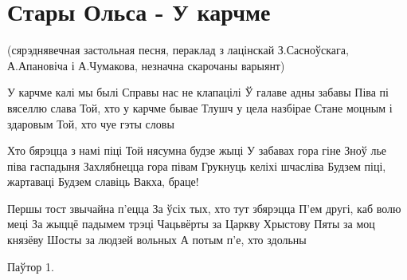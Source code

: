 \section{Стары Ольса - У карчме}
\begin{guitar}

(сярэднявечная застольная песня, пераклад з лацінскай 
З.Сасноўскага, А.Апановіча і А.Чумакова, незначна скарочаны варыянт)

У карчме калі мы былі
Справы нас не клапацілі
Ў галаве адны забавы
Піва пі вяселлю слава
Той, хто у карчме бывае
Тлушч у цела назбірае
Стане моцным і здаровым
Той, хто чуе гэты словы

Хто бярэцца з намі піці
Той нясумна будзе жыці
У забавах гора гіне
Зноў лье піва гаспадыня
Захлябнецца гора півам
Грукнуць келіхі шчасліва
Будзем піці, жартаваці
Будзем славіць Вакха, браце!

Першы тост звычайна п'ецца
За ўсіх тых, хто тут збярэцца
П'ем другі, каб волю меці
За жыццё падымем трэці
Чацьвёрты за Царкву Хрыстову
Пяты за моц князёву
Шосты за людзей вольных
А потым п'е, хто здольны

Паўтор 1.
\end{guitar}

